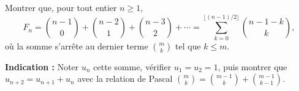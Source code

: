 Montrer que, pour tout entier $n \geq 1$,
\[
F_n = \binom{n-1}{0} + \binom{n-2}{1} + \binom{n-3}{2} + \cdots
= \sum_{k=0}^{\lfloor (n-1)/2 \rfloor} \binom{n-1-k}{k},
\]
où la somme s'arrête au dernier terme $\binom{m}{k}$ tel que $k \leq m$.

\textbf{Indication :} Noter $u_n$ cette somme, vérifier $u_1 = u_2 = 1$, puis
montrer que $u_{n+2} = u_{n+1} + u_n$ avec la relation de Pascal
$\binom{m}{k} = \binom{m-1}{k} + \binom{m-1}{k-1}$.
